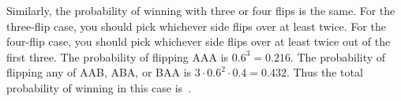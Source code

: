 \documentclass{article}
\begin{document}
Similarly, the probability of winning with three or four flips is the same.
For the three-flip case, you should pick whichever side flips over at least twice.
For the four-flip case, you should pick whichever side flips over at least twice out of the first three.
The probability of flipping AAA is $0.6^{3}=0.216$.
The probability of flipping any of AAB, ABA, or BAA is $3\cdot0.6^{2}\cdot0.4=0.432$.
Thus the total probability of winning in this case is
\,.
\end{document}
